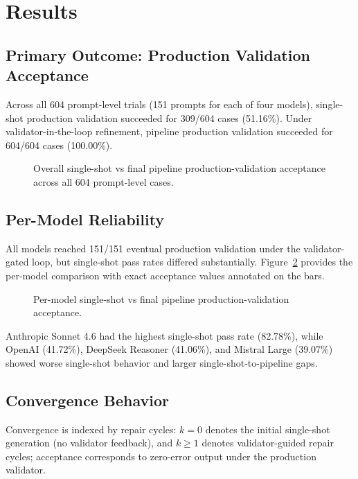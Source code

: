 \section{Results}

\subsection{Primary Outcome: Production Validation Acceptance}
Across all 604 prompt-level trials (151 prompts for each of four models), single-shot production validation succeeded for 309/604 cases (51.16\%). Under validator-in-the-loop refinement, pipeline production validation succeeded for 604/604 cases (100.00\%).

\begin{figure}[H]
\centering
% 
% 

\caption{Overall single-shot vs final pipeline production-validation acceptance across all 604 prompt-level cases.}
\label{fig:overall_baseline_vs_pipeline}
\end{figure}

\subsection{Per-Model Reliability}
All models reached 151/151 eventual production validation under the validator-gated loop, but single-shot pass rates differed substantially. Figure~\ref{fig:by_model_baseline_vs_pipeline} provides the per-model comparison with exact acceptance values annotated on the bars.

\begin{figure}[H]
\centering

\caption{Per-model single-shot vs final pipeline production-validation acceptance.}
\label{fig:by_model_baseline_vs_pipeline}
\end{figure}

Anthropic Sonnet 4.6 had the highest single-shot pass rate (82.78\%), while OpenAI (41.72\%), DeepSeek Reasoner (41.06\%), and Mistral Large (39.07\%) showed worse single-shot behavior and larger single-shot-to-pipeline gaps.

\subsection{Convergence Behavior}
Convergence is indexed by repair cycles: $k=0$ denotes the initial single-shot generation (no validator feedback), and $k\geq 1$ denotes validator-guided repair cycles; acceptance corresponds to zero-error output under the production validator.

